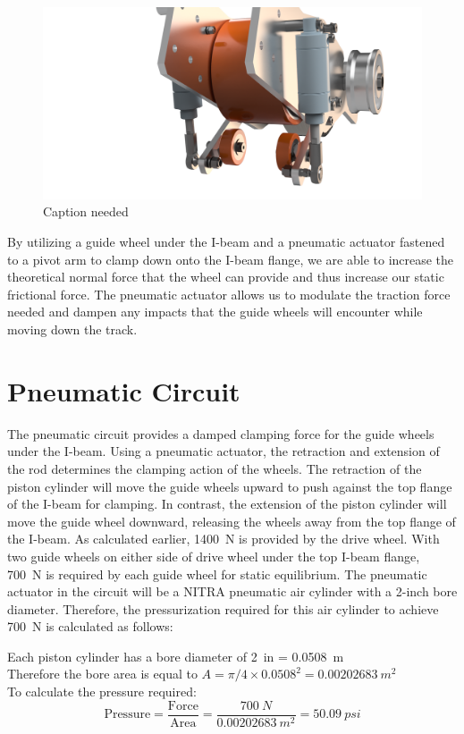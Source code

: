 \documentclass[main.tex]{subfiles}
\begin{document}
    \begin{figure}[H]
        \centering
        \includegraphics[width=\linewidth]{images/fig20}
        \caption{Caption needed}
    \end{figure}
    By utilizing a guide wheel under the I-beam and a pneumatic actuator fastened to a pivot arm to clamp down onto the I-beam flange, we are able to increase the theoretical normal force that the wheel can provide and thus increase our static frictional force. The pneumatic actuator allows us to modulate the traction force needed and dampen any impacts that the guide wheels will encounter while moving down the track.\\

    \section{Pneumatic Circuit}
	The pneumatic circuit provides a damped clamping force for the guide wheels under the I-beam. Using a pneumatic actuator, the retraction and extension of the rod determines the clamping action of the wheels. The retraction of the piston cylinder will move the guide wheels upward to push against the top flange of the I-beam for clamping. In contrast, the extension of the piston cylinder will move the guide wheel downward, releasing the wheels away from the top flange of the I-beam. As calculated earlier, \SI{1400}{N} is provided by the drive wheel. With two guide wheels on either side of drive wheel under the top I-beam flange, \SI{700}{N} is required by each guide wheel for static equilibrium. The pneumatic actuator in the circuit will be a NITRA pneumatic air cylinder with a 2-inch bore diameter. Therefore, the pressurization required for this air cylinder to achieve \SI{700}{N} is calculated as follows:\\

	\begin{center}
		Each piston cylinder has a bore diameter of \SI{2}{in} = \SI{0.0508}{m}\\
        Therefore the bore area is equal to $A = \pi/4 \times {0.0508^2} = \SI{0.00202683}{m^2}$ \\
        To calculate the pressure required:
        \[
      \textrm{Pressure} = \frac{\textrm{Force}}{\textrm{Area}} = \frac{\SI{700}{N}}{\SI{0.00202683}{m^2}} = \SI{50.09}{psi}
        \]
	\end{center}
\end{document}
